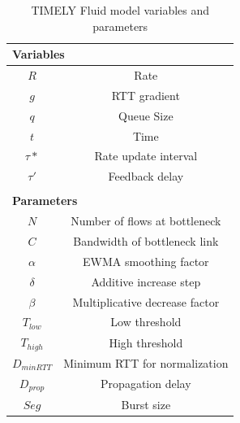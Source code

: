 \begin{table}[t]
\center
{
\footnotesize
{
\begin{tabular}{|c|c|}
\multicolumn{2}{l}{\bf Variables} \\ \hline
$R$ & Rate \\ \hline
$g$ & RTT gradient\\ \hline
$q$ & Queue Size \\ \hline
$t$ & Time \\ \hline
$\tau*$ & Rate update interval \\ \hline
$\tau'$ & Feedback delay \\ \hline
\multicolumn{2}{c}{} \\
\multicolumn{2}{l}{\bf Parameters} \\ \hline
$N$ & Number of flows at bottleneck\\ \hline
$C$ & Bandwidth of bottleneck link\\ \hline
$\alpha$ & EWMA smoothing factor\\ \hline
$\delta$ & Additive increase step\\ \hline
$\beta$ & Multiplicative decrease factor\\ \hline
$T_{low}$ & Low threshold\\ \hline
$T_{high}$ & High threshold\\ \hline
$D_{minRTT}$ & Minimum RTT for normalization \\ \hline
$D_{prop}$ & Propagation delay \\ \hline
$Seg$ & Burst size \\ \hline
\end{tabular}
}
}
\caption{TIMELY Fluid model variables and parameters}
\label{tab:timely_varparam}
\end{table}


